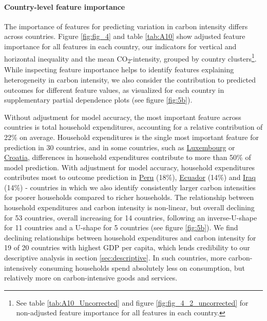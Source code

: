 \documentclass[12pt, a4paper]{article}
\begin{document}
\paragraph{Country-level feature importance}
The importance of features for predicting variation in carbon intensity differs across countries. Figure \ref{fig:fig_4} and table \ref{tab:A10} show adjusted feature importance for all features in each country, our indicators for vertical and horizontal inequality and the mean CO\textsubscript{2}-intensity, grouped by country clusters\footnote{See table \ref{tab:A10_Uncorrected} and figure \ref{fig:fig_4_2_uncorrected} for non-adjusted feature importance for all features in each country.}. While inspecting feature importance helps to identify features explaining heterogeneity in carbon intensity, we also consider the contribution to predicted outcomes for different feature values, as visualized for each country in supplementary partial dependence plots (see figure \ref{fig:5b}).

Without adjustment for model accuracy, the most important feature across countries is total household expenditures, accounting for a relative contribution of 22\% on average. Household expenditures is the single most important feature for prediction in 30 countries, and in some countries, such as \hyperref[fig:5b_LUX]{Luxembourg} or \hyperref[fig:5b_HRV]{Croatia}, differences in household expenditures contribute to more than 50\% of model prediction. With adjustment for model accuracy, household expenditures contributes most to outcome prediction in \hyperref[fig:5b_PER]{Peru} (18\%), \hyperref[fig:5b_ECU]{Ecuador} (14\%) and \hyperref[fig:5b_IRQ]{Iraq} (14\%) - countries in which we also identify consistently larger carbon intensities for poorer households compared to richer households. The relationship between household expenditures and carbon intensity is non-linear, but overall declining for 53 countries, overall increasing for 14 countries, following an inverse-U-shape for 11 countries and a U-shape for 5 countries (see figure \ref{fig:5b}). We find declining relationships between household expenditures and carbon intensity for 19 of 20 countries with highest GDP per capita, which lends credibility to our descriptive analysis in section \ref{sec:descriptive}. In such countries, more carbon-intensively consuming households spend absolutely less on consumption, but relatively more on carbon-intensive goods and services.
\end{document}
